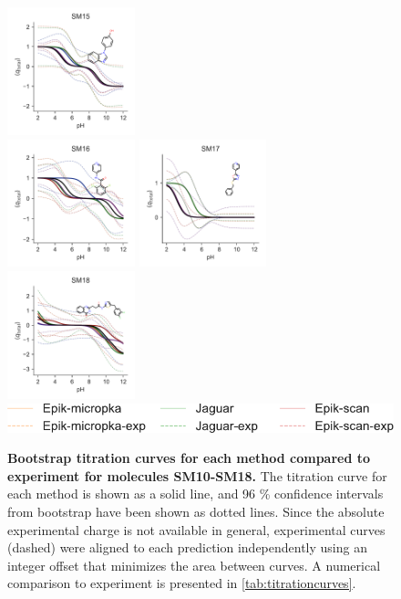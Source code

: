 \documentclass[9pt,lineno,final]{elife}
\begin{document}
\begin{figure}[hbt]
	\includegraphics[width=0.33\textwidth]{Reports/overview-SM15-titration-bootstrap-molecule.pdf}	 \\
	\includegraphics[width=0.33\textwidth]{Reports/overview-SM16-titration-bootstrap-molecule.pdf}
	\includegraphics[width=0.33\textwidth]{Reports/overview-SM17-titration-bootstrap-molecule.pdf}
	\includegraphics[width=0.33\textwidth]{Reports/overview-SM18-titration-bootstrap-molecule.pdf}	 \\
	\includegraphics[]{Reports/overview-legend.pdf}

	\caption{{\bf Bootstrap titration curves for each method compared to experiment for molecules SM10-SM18.} The titration curve for each method is shown as a solid line, and 96 \% confidence intervals from bootstrap have been shown as dotted lines. Since the absolute experimental charge is not available in general, experimental curves (dashed) were aligned to each prediction independently using an integer offset that minimizes the area between curves. A numerical comparison to experiment is presented in \cref{tab:titrationcurves}.
	\label{fig:charge-curves2}}

\end{figure}
    
\end{document}
